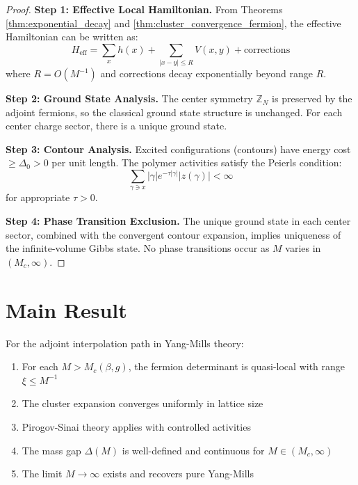 \begin{proof}
\textbf{Step 1: Effective Local Hamiltonian.}
From Theorems \ref{thm:exponential_decay} and \ref{thm:cluster_convergence_fermion}, the effective Hamiltonian can be written as:
\begin{equation}
H_{\text{eff}} = \sum_x h(x) + \sum_{|x-y| \leq R} V(x,y) + \text{corrections}
\end{equation}
where $R = O(M^{-1})$ and corrections decay exponentially beyond range $R$.

\textbf{Step 2: Ground State Analysis.}
The center symmetry $\mathbb{Z}_N$ is preserved by the adjoint fermions, so the classical ground state structure is unchanged. For each center charge sector, there is a unique ground state.

\textbf{Step 3: Contour Analysis.}
Excited configurations (contours) have energy cost $\geq \Delta_0 > 0$ per unit length. The polymer activities satisfy the Peierls condition:
\begin{equation}
\sum_{\gamma \ni x} |\gamma| e^{-\tau |\gamma|} |z(\gamma)| < \infty
\end{equation}
for appropriate $\tau > 0$.

\textbf{Step 4: Phase Transition Exclusion.}
The unique ground state in each center sector, combined with the convergent contour expansion, implies uniqueness of the infinite-volume Gibbs state. No phase transitions occur as $M$ varies in $(M_c, \infty)$.
\end{proof}

\section{Main Result}

\begin{theorem}
\label{thm:main_locality_result}
For the adjoint interpolation path in Yang-Mills theory:
\begin{enumerate}
    \item For each $M > M_c(\beta, g)$, the fermion determinant is quasi-local with range $\xi \leq M^{-1}$
    \item The cluster expansion converges uniformly in lattice size
    \item Pirogov-Sinai theory applies with controlled activities
    \item The mass gap $\Delta(M)$ is well-defined and continuous for $M \in (M_c, \infty)$
    \item The limit $M \to \infty$ exists and recovers pure Yang-Mills
\end{enumerate}
\end{theorem}

